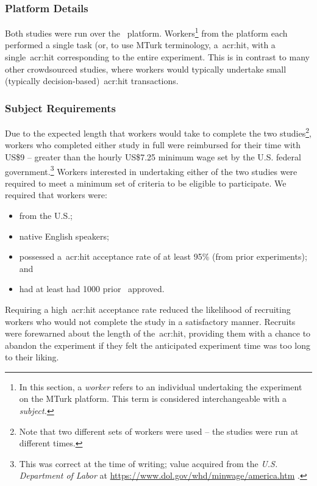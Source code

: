 \subsubsection{Platform Details}\label{sec:methodology:user:crowdsourcing:platform}
Both studies were run over the~ platform. Workers\footnote{In this section, a \emph{worker} refers to an individual undertaking the experiment on the MTurk platform. This term is considered interchangeable with a \emph{subject.}} from the platform each performed a single task (or, to use MTurk terminology, a~\gls{acr:hit}, with a single~\gls{acr:hit} corresponding to the entire experiment. This is in contrast to many other crowdsourced studies, where workers would typically undertake small (typically decision-based)~\gls{acr:hit} transactions.

\subsubsection{Subject Requirements}\label{sec:methodology:user:crowdsourcing:subjects}
Due to the expected length that workers would take to complete the two studies\footnote{Note that two different sets of workers were used -- the studies were run at different times.}, workers who completed either study in full were reimbursed for their time with US\$9 -- greater than the hourly US\$7.25 minimum wage set by the U.S. federal government.\footnote{This was correct at the time of writing; value acquired from the \emph{U.S. Department of Labor} at \url{https://www.dol.gov/whd/minwage/america.htm} .} Workers interested in undertaking either of the two studies were required to meet a minimum set of criteria to be eligible to participate. We required that workers were:

\begin{itemize}
    \item{from the U.S.;}
    \item{native English speakers;}
    \item{possessed a~\gls{acr:hit} acceptance rate of at least 95\% (from prior experiments); and}
    \item{had at least had 1000 prior~ approved.}
\end{itemize}

Requiring a high~\gls{acr:hit} acceptance rate reduced the likelihood of recruiting workers who would not complete the study in a satisfactory manner. Recruits were forewarned about the length of the~\gls{acr:hit}, providing them with a chance to abandon the experiment if they felt the anticipated experiment time was too long to their liking.

